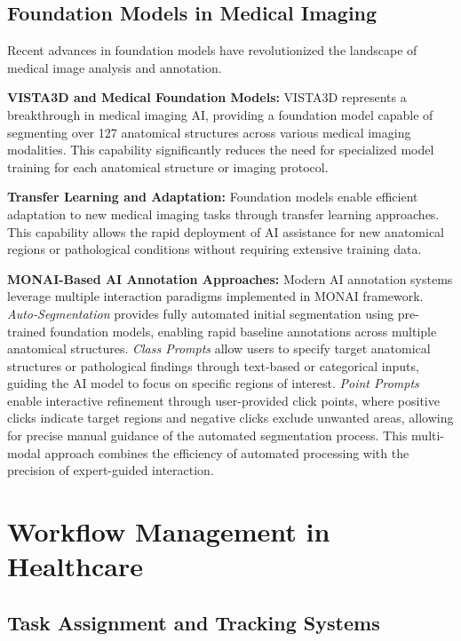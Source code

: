 \subsection{Foundation Models in Medical Imaging}

Recent advances in foundation models have revolutionized the landscape of medical image analysis and annotation.

\textbf{VISTA3D and Medical Foundation Models:} VISTA3D represents a breakthrough in medical imaging AI, providing a foundation model capable of segmenting over 127 anatomical structures across various medical imaging modalities. This capability significantly reduces the need for specialized model training for each anatomical structure or imaging protocol.

\textbf{Transfer Learning and Adaptation:} Foundation models enable efficient adaptation to new medical imaging tasks through transfer learning approaches. This capability allows the rapid deployment of AI assistance for new anatomical regions or pathological conditions without requiring extensive training data.

\textbf{MONAI-Based AI Annotation Approaches:} Modern AI annotation systems leverage multiple interaction paradigms implemented in MONAI framework. \textit{Auto-Segmentation} provides fully automated initial segmentation using pre-trained foundation models, enabling rapid baseline annotations across multiple anatomical structures. \textit{Class Prompts} allow users to specify target anatomical structures or pathological findings through text-based or categorical inputs, guiding the AI model to focus on specific regions of interest. \textit{Point Prompts} enable interactive refinement through user-provided click points, where positive clicks indicate target regions and negative clicks exclude unwanted areas, allowing for precise manual guidance of the automated segmentation process. This multi-modal approach combines the efficiency of automated processing with the precision of expert-guided interaction.

\section{Workflow Management in Healthcare}

\subsection{Task Assignment and Tracking Systems}

